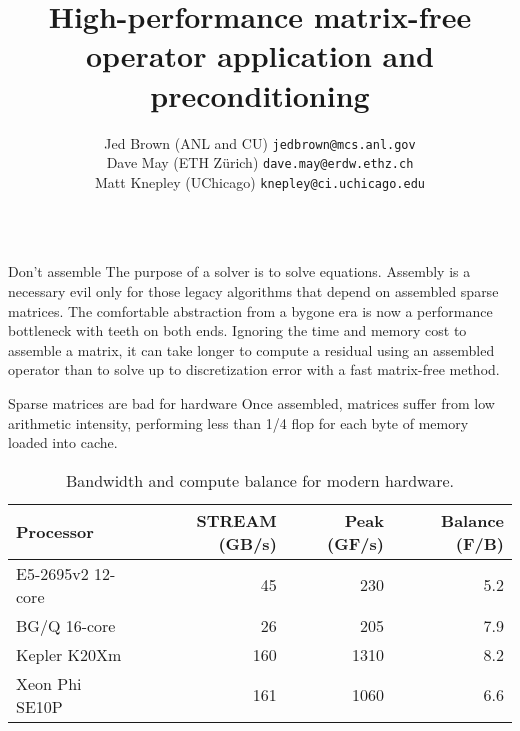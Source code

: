 \documentclass[final,t]{beamer}
\title{\huge High-performance matrix-free \\ operator application and preconditioning}
\author[Jed Brown]{Jed Brown (ANL and CU) {\texttt{jedbrown@mcs.anl.gov}}\\
Dave May (ETH Z\"urich) {\texttt{dave.may@erdw.ethz.ch}}\\
Matt Knepley (UChicago) {\texttt{knepley@ci.uchicago.edu}}}
\institute[MCS]{Download this poster from \url{http://59A2.org/files/201405-MatrixFree.pdf}}
\begin{document}
\begin{frame}{} 
  \vspace{-3em}
  \begin{columns}
    \begin{column}{0.48\textwidth}
      \begin{block}{Don't assemble}
        The purpose of a solver is to solve equations.
        Assembly is a necessary evil only for those legacy algorithms that depend on assembled sparse matrices.
        The comfortable abstraction from a bygone era is now a performance bottleneck with teeth on both ends.
        Ignoring the time and memory cost to assemble a matrix, it can take longer to compute a residual using an assembled operator than to solve up to discretization error with a fast matrix-free method.
      \end{block}
      \vspace{-2.2em}
      \begin{block}{Sparse matrices are bad for hardware}
        Once assembled, matrices suffer from low arithmetic intensity, performing less than 1/4 flop for each byte of memory loaded into cache.
        \begin{table}
          \caption{Bandwidth and compute balance for modern hardware.}
          \begin{tabular}{lrrr}
            \toprule
            Processor & STREAM (GB/s) & Peak (GF/s) & Balance (F/B) \\
            \midrule
            E5-2695v2 12-core   & 45   & 230  & 5.2 \\ %
            BG/Q 16-core    & 26   & 205  & 7.9 \\
            Kepler K20Xm        & 160 & 1310 & 8.2 \\ %
            Xeon Phi SE10P      & 161 & 1060 & 6.6 \\ %
            \bottomrule
          \end{tabular}
        \end{table}

\end{block}
\end{column}
\end{columns}
\end{frame}
\end{document}
